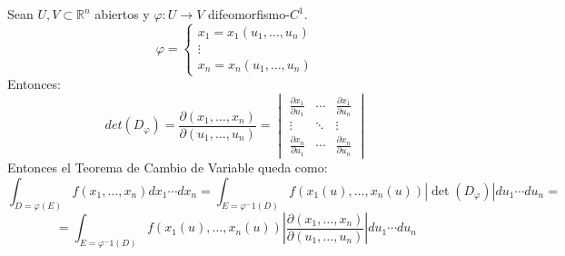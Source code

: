     \begin{observación}
    Sean $U, V \subset \mathbb{R}^n$ abiertos y $\varphi: U \to V$ difeomorfismo-$C^1$.
    $$\varphi = \begin{cases} x_1 = x_1(u_1, \ldots, u_n) \\ \vdots \\ x_n = x_n(u_1, \ldots, u_n) \end{cases}$$
    Entonces:
    $$det(D_{\varphi}) = \frac{\partial{(x_1, \ldots, x_n)}}{\partial{(u_1, \ldots, u_n)}} = \begin{vmatrix} \frac{\partial{x_1}}{\partial{u_1}} & \cdots & \frac{\partial{x_1}}{\partial{u_n}} \\ \vdots & \ddots & \vdots \\ \frac{\partial{x_n}}{\partial{u_1}} & \cdots & \frac{\partial{x_n}}{\partial{u_n}} \end{vmatrix}$$
    Entonces el Teorema de Cambio de Variable queda como:
    $$\int_{D = \varphi(E)} f(x_1, \ldots, x_n)dx_1 \cdots dx_n = \int_{E = \varphi^-1(D)} f(x_1(u), \ldots, x_n(u))|\det(D_{\varphi})|du_1 \cdots du_n =$$ $$
        = \int_{E = \varphi^-1(D)} f(x_1(u), \ldots, x_n(u))|\frac{\partial{(x_1, \ldots, x_n)}}{\partial{(u_1, \ldots, u_n)}}|du_1 \cdots du_n$$
    \end{observación}
    
